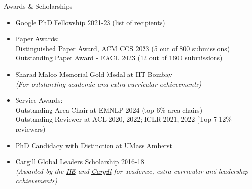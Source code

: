 \documentclass{resume} %
\begin{document}
\begin{rSection}{Awards \& Scholarships}
\vspace*{0.2in}
\begin{itemize}[leftmargin=*]
\setlength\itemsep{0.4em}
\item Google PhD Fellowship 2021-23 (\href{https://research.google/outreach/phd-fellowship/recipients/?category=2021}{list of recipients}) 
\item Paper Awards:\\
Distinguished Paper Award, ACM CCS 2023 (5 out of 800 submissions) \\
Outstanding Paper Award - EACL 2023 (12 out of 1600 submissions)
\item Sharad Maloo Memorial Gold Medal at IIT Bombay\\
\textit{(For outstanding academic and extra-curricular achievements)}
\item Service Awards:\\
Outstanding Area Chair at EMNLP 2024 (top 6\% area chairs) \\
Outstanding Reviewer at ACL 2020, 2022; ICLR 2021, 2022  (Top 7-12\% reviewers)
\item PhD Candidacy with Distinction at UMass Amherst
\item Cargill Global Leaders Scholarship 2016-18 \\
\textit{(Awarded by the \href{https://en.wikipedia.org/wiki/Institute_of_International_Education}{IIE} and \href{https://en.wikipedia.org/wiki/Cargill}{Cargill} for academic, extra-curricular and leadership achievements)}
\end{itemize}
\end{rSection}

\vspace*{0.1in}
\end{document}
